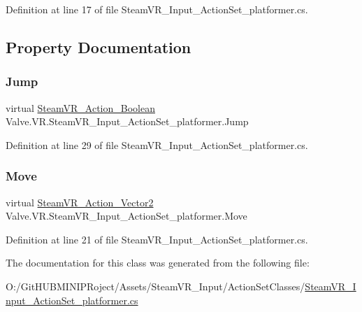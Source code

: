 Definition at line 17 of file Steam\+V\+R\+\_\+\+Input\+\_\+\+Action\+Set\+\_\+platformer.\+cs.



\subsection{Property Documentation}
\mbox{\label{class_valve_1_1_v_r_1_1_steam_v_r___input___action_set__platformer_a2abd6fbf45f724e0c2cdf0851ac43702}} 
\subsubsection{\texorpdfstring{Jump}{Jump}}
{\footnotesize\ttfamily virtual \mbox{\hyperlink{class_valve_1_1_v_r_1_1_steam_v_r___action___boolean}{Steam\+V\+R\+\_\+\+Action\+\_\+\+Boolean}} Valve.\+V\+R.\+Steam\+V\+R\+\_\+\+Input\+\_\+\+Action\+Set\+\_\+platformer.\+Jump\hspace{0.3cm}{\ttfamily [get]}}



Definition at line 29 of file Steam\+V\+R\+\_\+\+Input\+\_\+\+Action\+Set\+\_\+platformer.\+cs.

\mbox{\label{class_valve_1_1_v_r_1_1_steam_v_r___input___action_set__platformer_a03c04772957310b9269d40b9f30defc3}} 
\subsubsection{\texorpdfstring{Move}{Move}}
{\footnotesize\ttfamily virtual \mbox{\hyperlink{class_valve_1_1_v_r_1_1_steam_v_r___action___vector2}{Steam\+V\+R\+\_\+\+Action\+\_\+\+Vector2}} Valve.\+V\+R.\+Steam\+V\+R\+\_\+\+Input\+\_\+\+Action\+Set\+\_\+platformer.\+Move\hspace{0.3cm}{\ttfamily [get]}}



Definition at line 21 of file Steam\+V\+R\+\_\+\+Input\+\_\+\+Action\+Set\+\_\+platformer.\+cs.



The documentation for this class was generated from the following file\+:\begin{DoxyCompactItemize}
\item 
O\+:/\+Git\+H\+U\+B\+M\+I\+N\+I\+P\+Roject/\+Assets/\+Steam\+V\+R\+\_\+\+Input/\+Action\+Set\+Classes/\mbox{\hyperlink{_steam_v_r___input___action_set__platformer_8cs}{Steam\+V\+R\+\_\+\+Input\+\_\+\+Action\+Set\+\_\+platformer.\+cs}}\end{DoxyCompactItemize}
